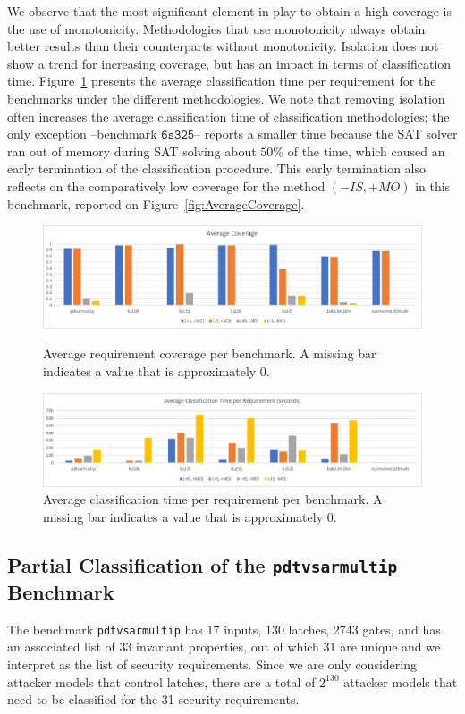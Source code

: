 {\color{red}

We observe that the most significant element in play to obtain a high coverage is the use of monotonicity. Methodologies that use monotonicity always obtain better results than their counterparts without monotonicity. Isolation does not show a trend for increasing coverage, but has an impact in terms of classification time. Figure~\ref{fig:AverageExecTime} presents the average classification time per requirement for the benchmarks under the different methodologies. We note that removing isolation often increases the average classification time of classification methodologies; the only exception --benchmark $\mathtt{6s325}$-- reports a smaller time because the SAT solver ran out of memory during SAT solving about $50\%$ of the time, which caused an early termination of the classification procedure. This early termination also reflects on the comparatively low coverage for the method $(-IS,+MO)$ in this benchmark, reported on Figure~\ref{fig:AverageCoverage}.

\begin{figure}[!t]
\centering
\includegraphics[width=\textwidth]{AverageCoverage}
\caption{Average requirement coverage per benchmark. A missing bar indicates a value that is approximately 0.}
\label{fig:AverageCoverage}
\vspace{0.5cm}
\includegraphics[width=\textwidth]{AverageExecutionTime}
\caption{Average classification time per requirement per benchmark. A missing bar indicates a value that is approximately 0. }
\label{fig:AverageExecTime}
\end{figure}

\subsection{Partial Classification of the \texttt{pdtvsarmultip} Benchmark}
The benchmark \texttt{pdtvsarmultip} has 17 inputs, %
130 latches, %
2743 gates, %
and has an associated list of 33 invariant properties, out of which 31 are unique and we interpret as the list of security requirements. 
Since we are only considering attacker models that control latches, there are a total of $2^{130}$ attacker models that need to be classified for the 31 security requirements.

}
